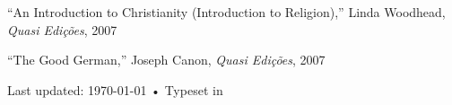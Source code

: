 \documentclass[11pt, a4paper]{article}
\newcommand{\years}[1]{\marginnote{\scriptsize #1}}
\begin{document}
\noindent\years{2007\emph{a}} ``An Introduction to Christianity (Introduction to
Religion),'' Linda Woodhead, \emph{Quasi Edições}, 2007


\noindent\years{2007\emph{b}} ``The Good German,'' Joseph Canon, \emph{Quasi Edições}, 2007











\vfill{}

\begin{center}
  {\scriptsize  Last updated: \today\- •\- Typeset in \href{http://nitens.org/taraborelli/cvtex}{
      \XeTeX }}\\
\end{center}
\end{document}
